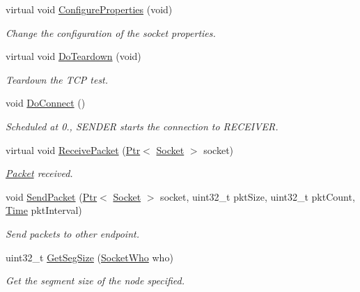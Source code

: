 \begin{DoxyCompactItemize}
virtual void \hyperlink{classns3_1_1TcpGeneralTest_a48b3f15add5cb4b3a9906bd5240e64be}{Configure\+Properties} (void)
\begin{DoxyCompactList}\small\item\em Change the configuration of the socket properties. \end{DoxyCompactList}\item 
virtual void \hyperlink{classns3_1_1TcpGeneralTest_ae26a8f8ef494d87c4645892f3845f337}{Do\+Teardown} (void)
\begin{DoxyCompactList}\small\item\em Teardown the T\+CP test. \end{DoxyCompactList}\item 
void \hyperlink{classns3_1_1TcpGeneralTest_a9ba3be0d97a9da9025ac2fcd3d703902}{Do\+Connect} ()
\begin{DoxyCompactList}\small\item\em Scheduled at 0., S\+E\+N\+D\+ER starts the connection to R\+E\+C\+E\+I\+V\+ER. \end{DoxyCompactList}\item 
virtual void \hyperlink{classns3_1_1TcpGeneralTest_aa948f005f343ea14a3c563e2d562344b}{Receive\+Packet} (\hyperlink{classns3_1_1Ptr}{Ptr}$<$ \hyperlink{classns3_1_1Socket}{Socket} $>$ socket)
\begin{DoxyCompactList}\small\item\em \hyperlink{classns3_1_1Packet}{Packet} received. \end{DoxyCompactList}\item 
void \hyperlink{classns3_1_1TcpGeneralTest_ab7a2d9e8e8258fb18760c802ffa11c7c}{Send\+Packet} (\hyperlink{classns3_1_1Ptr}{Ptr}$<$ \hyperlink{classns3_1_1Socket}{Socket} $>$ socket, uint32\+\_\+t pkt\+Size, uint32\+\_\+t pkt\+Count, \hyperlink{classns3_1_1Time}{Time} pkt\+Interval)
\begin{DoxyCompactList}\small\item\em Send packets to other endpoint. \end{DoxyCompactList}\item 
uint32\+\_\+t \hyperlink{classns3_1_1TcpGeneralTest_aa582b6345d877750962fc34012c9e20a}{Get\+Seg\+Size} (\hyperlink{classns3_1_1TcpGeneralTest_a29338e6b7137cad650c2ff835713f6ee}{Socket\+Who} who)
\begin{DoxyCompactList}\small\item\em Get the segment size of the node specified. \end{DoxyCompactList}\item 

\end{DoxyCompactItemize}
